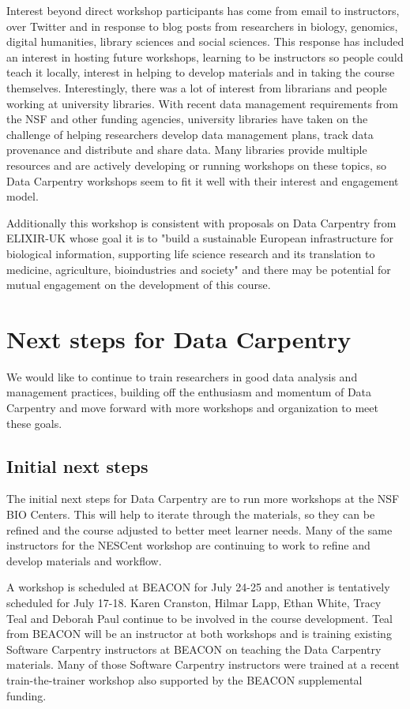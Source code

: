 \documentclass[11pt]{article}
\begin{document}
Interest beyond direct workshop participants has come from email to instructors, over Twitter and in response to blog posts from researchers in biology, genomics, digital humanities, library sciences and social sciences.
This response has 
included an interest in hosting future workshops, learning to be 
instructors so people could teach it locally, interest in helping to develop materials and in taking the course themselves.
Interestingly, there was a lot of interest from librarians and people working at university libraries. With recent data management requirements from the NSF and other funding agencies, university libraries have
taken on the challenge of helping researchers develop data management plans, track data provenance and 
distribute and share data. Many libraries provide multiple resources and are actively developing or running workshops
on these topics, so Data Carpentry workshops seem to fit it well with their interest and engagement model.

Additionally this workshop is consistent with proposals on Data Carpentry from ELIXIR-UK whose goal it is to "build a sustainable European infrastructure for biological information, supporting life science research and its translation to medicine, agriculture, bioindustries and society" and there may be potential for mutual engagement on the development of this course. 

\section{Next steps for Data Carpentry}

We would like to continue to train researchers in good data analysis and management practices, building off the enthusiasm and momentum of Data Carpentry and move forward with more workshops and organization to meet 
these goals.

\subsection{Initial next steps}

The initial next steps for Data Carpentry are to run more workshops at the NSF BIO Centers. This will help to 
iterate through the materials, so they can be refined and the course adjusted to better meet learner needs. Many of the same instructors for the NESCent workshop are continuing to work to refine and develop materials and workflow.

A workshop is scheduled at BEACON for July 24-25 and another is tentatively scheduled for July 17-18. Karen Cranston, Hilmar Lapp, Ethan White, Tracy Teal and Deborah Paul continue to be involved in the course development. Teal from BEACON will be an instructor at both workshops and is training existing Software Carpentry instructors at BEACON on teaching the Data Carpentry materials. Many of those Software Carpentry instructors were trained at a recent train-the-trainer workshop also supported by the BEACON supplemental funding. 
\end{document}
